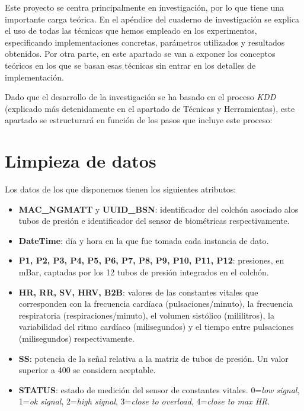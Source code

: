 \label{conceptos teoricos}

Este proyecto se centra principalmente en investigación, por lo que tiene una importante carga teórica. En el apéndice del cuaderno de investigación se explica el uso de todas las técnicas que hemos empleado en los experimentos, especificando implementaciones concretas, parámetros utilizados y resultados obtenidos. Por otra parte, en este apartado se van a exponer los conceptos teóricos en los que se basan esas técnicas sin entrar en los detalles de implementación.  

Dado que el desarrollo de la investigación se ha basado en el proceso \textit{KDD} (explicado más detenidamente en el apartado de Técnicas y Herramientas), este apartado se estructurará en función de los pasos que incluye este proceso: 

\section{Limpieza de datos}

Los datos de los que disponemos tienen los siguientes atributos: 

\begin{itemize}
	\item \textbf{MAC\_NGMATT} y \textbf{UUID\_BSN}: identificador del colchón asociado alos tubos de presión e identificador del sensor de biométricas respectivamente. 
	\item \textbf{DateTime}: día y hora en la que fue tomada cada instancia de dato. 
	\item \textbf{P1, P2, P3, P4, P5, P6, P7, P8, P9, P10, P11, P12}: presiones, en mBar, captadas por los 12 tubos de presión integrados en el colchón. 
	\item \textbf{HR, RR, SV, HRV, B2B}: valores de las constantes vitales que corresponden con la frecuencia cardíaca (pulsaciones/minuto), la frecuencia respiratoria (respiraciones/minuto), el volumen sistólico (mililitros), la variabilidad del ritmo cardíaco (milisegundos) y el tiempo entre pulsaciones (milisegundos) respectivamente. 
	\item \textbf{SS}: potencia de la señal relativa a la matriz de tubos de presión. Un valor superior a 400 se considera aceptable. 
	\item \textbf{STATUS}: estado de medición del sensor de constantes vitales. 0=\textit{low signal}, 1=\textit{ok signal}, 2=\textit{high signal}, 3=\textit{close to overload}, 4=\textit{close to max HR}. 
\end{itemize}


